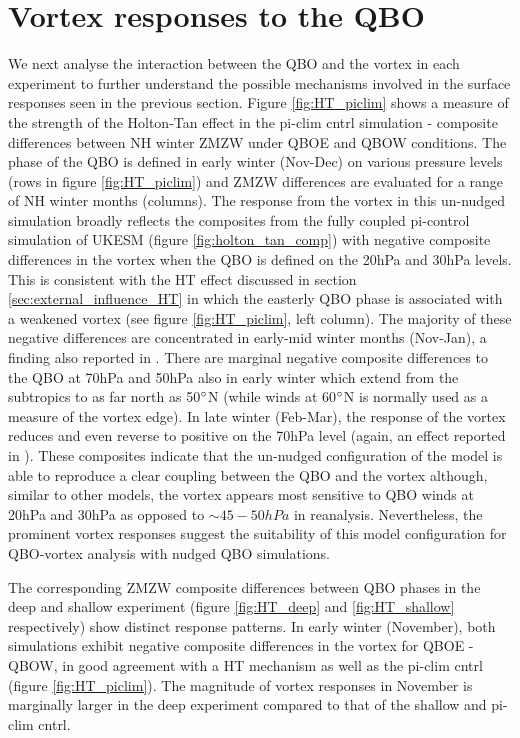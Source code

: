\section{Vortex responses to the QBO}
\label{sec:vortex_responses_QBO}
We next analyse the interaction between the QBO and the vortex in each experiment to further understand the possible mechanisms involved in the surface responses seen in the previous section. Figure \ref{fig:HT_piclim} shows a measure of the strength of the Holton-Tan effect in the pi-clim cntrl simulation - composite differences between NH winter ZMZW under QBOE and QBOW conditions. The phase of the QBO is defined in early winter (Nov-Dec) on various pressure levels (rows in figure \ref{fig:HT_piclim}) and ZMZW differences are evaluated for a range of NH winter months (columns). The response from the vortex in this un-nudged simulation broadly reflects the composites from the fully coupled pi-control simulation of UKESM (figure \ref{fig:holton_tan_comp}) with negative composite differences in the vortex when the QBO is defined on the 20hPa and 30hPa levels. This is consistent with the HT effect discussed in section \ref{sec:external_influence_HT} in which the easterly QBO phase is associated with a weakened vortex (see figure \ref{fig:HT_piclim}, left column). The majority of these negative differences are concentrated in early-mid winter months (Nov-Jan), a finding also reported in \cite{graySurface2018b}. There are marginal negative composite differences to the QBO at 70hPa and 50hPa also in early winter which extend from the subtropics to as far north as 50$\degree$N (while winds at 60$\degree$N is normally used as a measure of the vortex edge). In late winter (Feb-Mar), the response of the vortex reduces and even reverse to positive on the 70hPa level (again, an effect reported in \cite{graySurface2018b}). These composites indicate that the un-nudged configuration of the model is able to reproduce a clear coupling between the QBO and the vortex although, similar to other models, the vortex appears most sensitive to QBO winds at 20hPa and 30hPa as opposed to $\sim45-50hPa$ in reanalysis. Nevertheless, the prominent vortex responses suggest the suitability of this model configuration for QBO-vortex analysis with nudged QBO simulations.

The corresponding ZMZW composite differences between QBO phases in the deep and shallow experiment (figure \ref{fig:HT_deep} and \ref{fig:HT_shallow} respectively) show distinct response patterns. In early winter (November), both simulations exhibit negative composite differences in the vortex for QBOE - QBOW, in good agreement with a HT mechanism \citep{HoltonJamesRTan1980} as well as the pi-clim cntrl (figure \ref{fig:HT_piclim}). The magnitude of vortex responses in November is marginally larger in the deep experiment compared to that of the shallow and pi-clim cntrl. 

